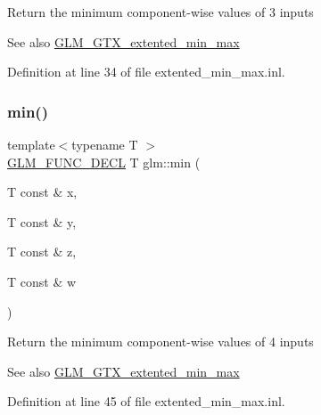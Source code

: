 Return the minimum component-\/wise values of 3 inputs \begin{DoxySeeAlso}{See also}
\hyperlink{group__gtx__extented__min__max}{G\+L\+M\+\_\+\+G\+T\+X\+\_\+extented\+\_\+min\+\_\+max} 
\end{DoxySeeAlso}


Definition at line 34 of file extented\+\_\+min\+\_\+max.\+inl.

\mbox{\label{group__gtx__extented__min__max_ga95466987024d03039607f09e69813d69}} 
\subsubsection{\texorpdfstring{min()}{min()}\hspace{0.1cm}{\footnotesize\ttfamily [4/6]}}
{\footnotesize\ttfamily template$<$typename T $>$ \\
\hyperlink{setup_8hpp_ab2d052de21a70539923e9bcbf6e83a51}{G\+L\+M\+\_\+\+F\+U\+N\+C\+\_\+\+D\+E\+CL} T glm\+::min (\begin{DoxyParamCaption}\item[{T const \&}]{x,  }\item[{T const \&}]{y,  }\item[{T const \&}]{z,  }\item[{T const \&}]{w }\end{DoxyParamCaption})}

Return the minimum component-\/wise values of 4 inputs \begin{DoxySeeAlso}{See also}
\hyperlink{group__gtx__extented__min__max}{G\+L\+M\+\_\+\+G\+T\+X\+\_\+extented\+\_\+min\+\_\+max} 
\end{DoxySeeAlso}


Definition at line 45 of file extented\+\_\+min\+\_\+max.\+inl.

\mbox{\label{group__gtx__extented__min__max_ga4fe35dd31dd0c45693c9b60b830b8d47}} 
